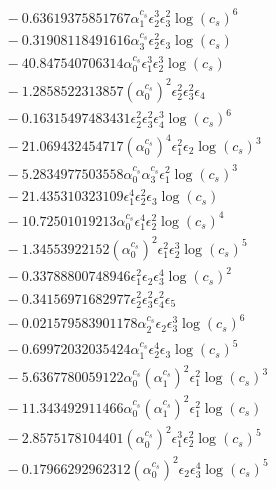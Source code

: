\documentclass[10pt]{article}
\begin{document}
\begin{align*}
&{}  - 0.63619375851767 \alpha_{1}^{c_s} \epsilon_{2}^{3} \epsilon_{3}^{2} \log{\left(c_{s} \right)}^{6} \\
&{}  - 0.31908118491616 \alpha_{3}^{c_s} \epsilon_{2}^{2} \epsilon_{3} \log{\left(c_{s} \right)} \\
&{}  - 40.847540706314 \alpha_{0}^{c_s} \epsilon_{1}^{3} \epsilon_{2}^{3} \log{\left(c_{s} \right)} \\
&{}  - 1.2858522313857 \left(\alpha_{0}^{c_s}\right)^{2} \epsilon_{2}^{2} \epsilon_{3}^{2} \epsilon_{4} \\
&{}  - 0.16315497483431 \epsilon_{2}^{2} \epsilon_{3}^{2} \epsilon_{4}^{3} \log{\left(c_{s} \right)}^{6} \\
&{}  - 21.069432454717 \left(\alpha_{0}^{c_s}\right)^{4} \epsilon_{1}^{2} \epsilon_{2} \log{\left(c_{s} \right)}^{3} \\
&{}  - 5.2834977503558 \alpha_{0}^{c_s} \alpha_{3}^{c_s} \epsilon_{1}^{2} \log{\left(c_{s} \right)}^{3} \\
&{}  - 21.435310323109 \epsilon_{1}^{4} \epsilon_{2}^{2} \epsilon_{3} \log{\left(c_{s} \right)} \\
&{}  - 10.72501019213 \alpha_{0}^{c_s} \epsilon_{1}^{4} \epsilon_{2}^{2} \log{\left(c_{s} \right)}^{4} \\
&{}  - 1.34553922152 \left(\alpha_{0}^{c_s}\right)^{2} \epsilon_{1}^{2} \epsilon_{2}^{3} \log{\left(c_{s} \right)}^{5} \\
&{}  - 0.33788800748946 \epsilon_{1}^{2} \epsilon_{2} \epsilon_{3}^{4} \log{\left(c_{s} \right)}^{2} \\
&{}  - 0.34156971682977 \epsilon_{2}^{2} \epsilon_{3}^{2} \epsilon_{4}^{2} \epsilon_{5} \\
&{}  - 0.021579583901178 \alpha_{2}^{c_s} \epsilon_{2} \epsilon_{3}^{3} \log{\left(c_{s} \right)}^{6} \\
&{}  - 0.69972032035424 \alpha_{1}^{c_s} \epsilon_{2}^{4} \epsilon_{3} \log{\left(c_{s} \right)}^{5} \\
&{}  - 5.6367780059122 \alpha_{0}^{c_s} \left(\alpha_{1}^{c_s}\right)^{2} \epsilon_{1}^{2} \log{\left(c_{s} \right)}^{3} \\
&{}  - 11.343492911466 \alpha_{0}^{c_s} \left(\alpha_{1}^{c_s}\right)^{2} \epsilon_{1}^{2} \log{\left(c_{s} \right)} \\
&{}  - 2.8575178104401 \left(\alpha_{0}^{c_s}\right)^{2} \epsilon_{1}^{3} \epsilon_{2}^{2} \log{\left(c_{s} \right)}^{5} \\
&{}  - 0.17966292962312 \left(\alpha_{0}^{c_s}\right)^{2} \epsilon_{2} \epsilon_{3}^{4} \log{\left(c_{s} \right)}^{5} \\

\end{align*}
\end{document}

